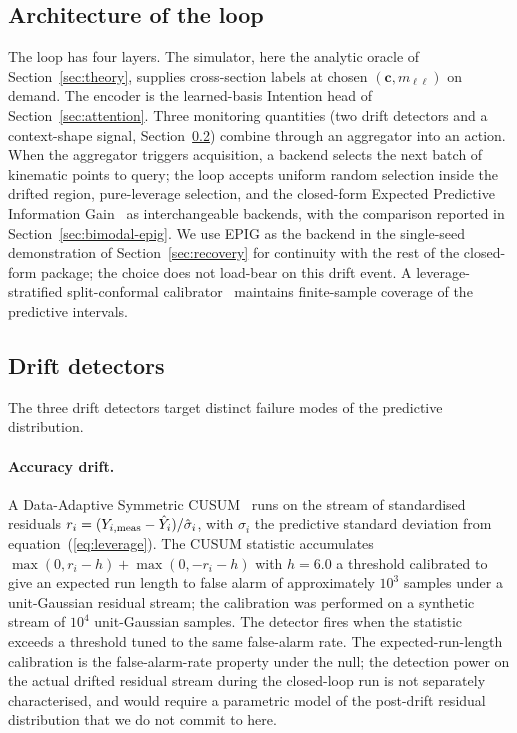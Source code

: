 \documentclass[11pt,a4paper]{article}
\newcommand{\mll}{m_{\ell\ell}}
\begin{document}
\subsection{Architecture of the loop}

The loop has four layers. The simulator, here the analytic oracle of Section~\ref{sec:theory}, supplies cross-section labels at chosen $(\bm{c}, \mll)$ on demand. The encoder is the learned-basis Intention head of Section~\ref{sec:attention}. Three monitoring quantities (two drift detectors and a context-shape signal, Section~\ref{sec:drift}) combine through an aggregator into an action. When the aggregator triggers acquisition, a backend selects the next batch of kinematic points to query; the loop accepts uniform random selection inside the drifted region, pure-leverage selection, and the closed-form Expected Predictive Information Gain~\cite{Smith:2023epig} as interchangeable backends, with the comparison reported in Section~\ref{sec:bimodal-epig}. We use EPIG as the backend in the single-seed demonstration of Section~\ref{sec:recovery} for continuity with the rest of the closed-form package; the choice does not load-bear on this drift event. A leverage-stratified split-conformal calibrator~\cite{Lei:2018conformal,Vovk:2005alg} maintains finite-sample coverage of the predictive intervals.

\subsection{Drift detectors}
\label{sec:drift}

The three drift detectors target distinct failure modes of the predictive distribution.

\paragraph{Accuracy drift.}
A Data-Adaptive Symmetric CUSUM~\cite{Ahad:2022dascusum} runs on the stream of standardised residuals $r_i = (Y_{i, \rm meas} - \hat{Y}_i) / \hat{\sigma}_i$, with $\hat{\sigma}_i$ the predictive standard deviation from equation~(\ref{eq:leverage}). The CUSUM statistic accumulates $\max(0, r_i - h) + \max(0, -r_i - h)$ with $h = 6.0$ a threshold calibrated to give an expected run length to false alarm of approximately $10^3$ samples under a unit-Gaussian residual stream; the calibration was performed on a synthetic stream of $10^4$ unit-Gaussian samples. The detector fires when the statistic exceeds a threshold tuned to the same false-alarm rate. The expected-run-length calibration is the false-alarm-rate property under the null; the detection power on the actual drifted residual stream during the closed-loop run is not separately characterised, and would require a parametric model of the post-drift residual distribution that we do not commit to here.
\end{document}
